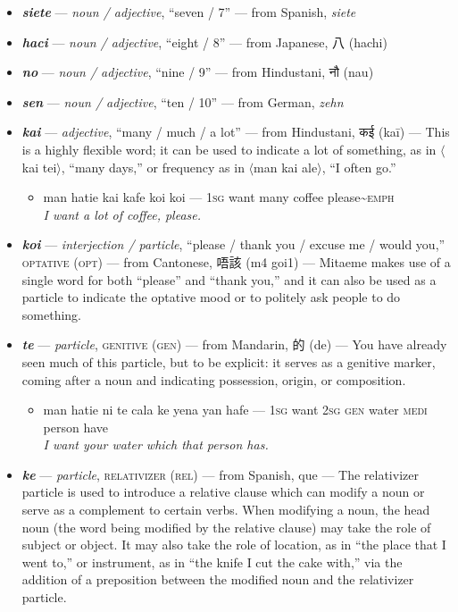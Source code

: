 \documentclass[a4paper, titlepage]{article}
\begin{document}
\begin{itemize}
	\item \textbf{\textit{siete}} —  \textit{noun / adjective}, ``seven / 7'' — from Spanish, \textit{siete}
	\item \textbf{\textit{haci}} —  \textit{noun / adjective}, ``eight / 8'' — from Japanese, 八 (hachi)
	\item \textbf{\textit{no}} —  \textit{noun / adjective}, ``nine / 9'' — from Hindustani, {\hmfont नौ} (nau)
	\item \textbf{\textit{sen}} —  \textit{noun / adjective}, ``ten / 10'' — from German, \textit{zehn}
	\item \textbf{\textit{kai}} —  \textit{adjective}, ``many / much / a lot'' — from Hindustani, {\hmfont कई} (kaī) — This is a highly flexible word; it can be used to indicate a lot of something, as in $\langle$kai tei$\rangle$, ``many days,'' or frequency as in $\langle$man kai ale$\rangle$, ``I often go.''
	\begin{itemize}
		\item man hatie kai kafe koi koi — \textsc{1sg} want many coffee please\textasciitilde{}\textsc{emph} \\\textit{I want a lot of coffee, please.}
	\end{itemize}
	\item \textbf{\textit{koi}} —  \textit{interjection / particle}, ``please / thank you / excuse me / would you,'' \textsc{optative (opt)} — from Cantonese, 唔該 (m4 goi1) — Mitaeme makes use of a single word for both ``please'' and ``thank you,'' and it can also be used as a particle to indicate the optative mood or to politely ask people to do something.
	\item \textbf{\textit{te}} —  \textit{particle}, \textsc{genitive (gen)} — from Mandarin, 的 (de) — You have already seen much of this particle, but to be explicit: it serves as a genitive marker, coming after a noun and indicating possession, origin, or composition.
	\begin{itemize}
		\item man hatie ni te cala ke yena yan hafe — \textsc{1sg} want \textsc{2sg gen} water \textsc{medi} person have \\\textit{I want your water which that person has.}
	\end{itemize}
	\item \textbf{\textit{ke}} —  \textit{particle}, \textsc{relativizer (rel)} — from Spanish, que — The relativizer particle is used to introduce a relative clause which can modify a noun or serve as a complement to certain verbs. When modifying a noun, the head noun (the word being modified by the relative clause) may take the role of subject or object. It may also take the role of location, as in ``the place that I went to,'' or instrument, as in ``the knife I cut the cake with,'' via the addition of a preposition between the modified noun and the relativizer particle.

\end{itemize}
\end{document}
